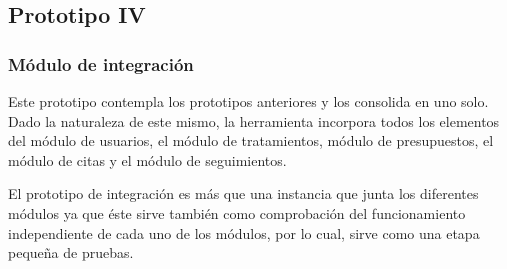 \subsection{Prototipo IV}
\subsubsection{Módulo de integración}

Este prototipo contempla los prototipos anteriores y los consolida en uno solo. Dado la naturaleza de este mismo, la herramienta incorpora todos los elementos del módulo de usuarios, el módulo de tratamientos, módulo de presupuestos, el módulo de citas y el módulo de seguimientos.

\vspace{1em}

El prototipo de integración es más que una instancia que junta los diferentes módulos ya que éste sirve también como comprobación del funcionamiento independiente de cada uno de los módulos, por lo cual, sirve como una etapa pequeña de pruebas.


